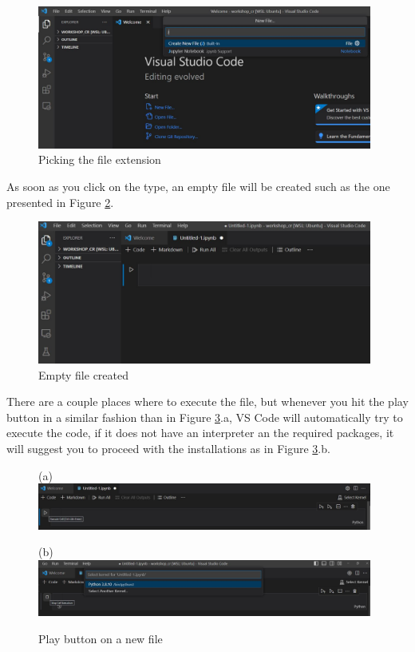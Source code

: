 \documentclass{assignment}
\begin{document}
\begin{figure}[h]
 \centering 
    \includegraphics[width=11cm]{assets/vs_code_jupyter_notebook.JPG}
    \caption{Picking the file extension}
    \label{fig:new_file_1}
\end{figure}


As soon as you click on the type, an empty file will be created such as the one presented in Figure \ref{fig:new_file_2}.

\begin{figure}[h]
 \centering 
    \includegraphics[width=11cm]{assets/vs_code_empty_file.JPG}
    \caption{Empty file created}
    \label{fig:new_file_2}
\end{figure}

There are a couple places where to execute the file, but whenever you hit the play button in a similar fashion than in Figure \ref{fig:new_file_3}.a, VS Code will automatically try to execute the code, if it does not have an interpreter an the required packages, it will suggest you to proceed with the installations as in Figure \ref{fig:new_file_3}.b.

\begin{figure}[h]
 \centering
 \begin{minipage}{12cm}
        (a)
        \centering
        \includegraphics[width=11cm]{assets/vs_code_empty_file_run_button.JPG}
 \end{minipage}
 \begin{minipage}{12cm}
    (b)
    \centering
        \includegraphics[width=11cm]{assets/vs_code_empty_file_run_button_hit.JPG}
 \end{minipage}
 \caption{Play button on a new file}
 \label{fig:new_file_3}
\end{figure}
\newpage
\end{document}
